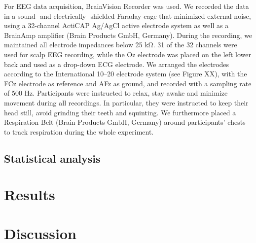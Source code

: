 \documentclass[11pt, oneside]{article}   	%
\begin{document}
For EEG data acquisition, BrainVision Recorder was used. We recorded the data in a sound- and electrically- shielded Faraday cage that minimized external noise, using a 32-channel ActiCAP Ag/AgCl active electrode system as well as a BrainAmp amplifier (Brain Products GmbH, Germany). During the recording, we maintained all electrode impedances below 25 kΩ. 31 of the 32 channels were used for scalp EEG recording, while the Oz electrode was placed on the left lower back and used as a drop-down ECG electrode. We arranged the electrodes according to the International 10–20 electrode system (see Figure XX), with the FCz electrode as reference and AFz as ground, and recorded with a sampling rate of 500 Hz. Participants were instructed to relax, stay awake and minimize movement during all recordings. In particular, they were instructed to keep their head still, avoid grinding their teeth and squinting. We furthermore placed a Respiration Belt (Brain Products GmbH, Germany) around participants’ chests to track respiration during the whole experiment. 

\subsection{Statistical analysis}


\section{Results}

\section{Discussion}


\end{document}

